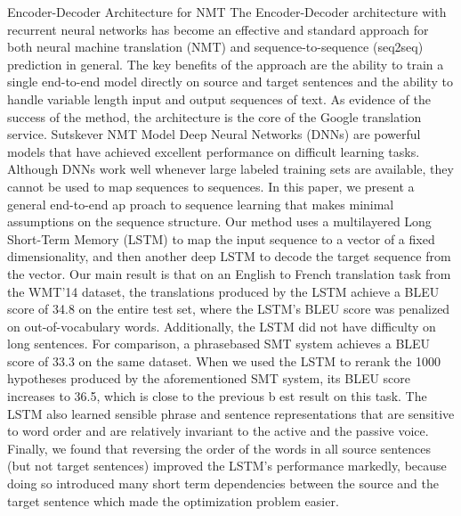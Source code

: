 Encoder-Decoder Architecture for NMT
The Encoder-Decoder architecture with recurrent neural networks has become an effective and standard approach for both neural machine translation (NMT) and sequence-to-sequence (seq2seq) prediction in general.
The key benefits of the approach are the ability to train a single end-to-end model directly on source and target sentences and the ability to handle variable length input and output sequences of text.
As evidence of the success of the method, the architecture is the core of the Google translation service.
Sutskever NMT Model \cite{Sutskever2014}
Deep Neural Networks (DNNs) are powerful models that have achieved excellent performance on difficult learning tasks. Although DNNs work well whenever large labeled training sets are available, they cannot be used to map sequences to sequences.  In this paper, we present a general end-to-end ap proach to sequence learning that makes minimal assumptions on the sequence structure. Our method uses a multilayered Long Short-Term Memory (LSTM) to map the input sequence to a vector of a fixed dimensionality, and then another deep LSTM to decode the target sequence from the vector.  Our main result is that on an English to French translation task from the WMT’14 dataset, the translations produced by the LSTM achieve a BLEU score of 34.8 on the entire test set,  where the LSTM’s BLEU score was penalized on out-of-vocabulary words. Additionally, the LSTM did not have difficulty on long sentences.  For comparison, a phrasebased SMT system achieves a BLEU score of 33.3 on the same dataset.  When we used the LSTM to rerank the 1000 hypotheses produced by the aforementioned SMT system, its BLEU score increases to 36.5, which is close to the previous b est result on this task.  The LSTM also learned sensible phrase and sentence representations that are sensitive to word order and are relatively invariant to the active and the passive voice.  Finally, we found that reversing the order of the words in all source sentences (but not target sentences) improved the LSTM’s performance markedly, because doing so introduced many short term dependencies between the source and the target sentence which made the optimization problem easier.

